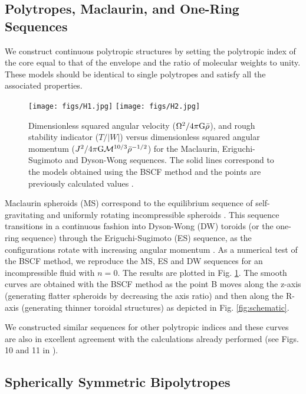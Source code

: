 \documentclass[a4paper,fleqn,usenatbib]{mnras}
\begin{document}
\subsection{Polytropes, Maclaurin, and One-Ring Sequences}

We construct continuous polytropic structures by setting the polytropic index of the core equal to that of the envelope and the ratio of molecular weights to unity. These models should be identical to single polytropes and satisfy all the associated properties. 

\begin{figure}
\centering
\texttt{[image: figs/H1.jpg]}
\texttt{[image: figs/H2.jpg]}
\caption{Dimensionless squared angular velocity ($\Omega^2/ {\rm 4 \pi G} \bar{\rho}$), and rough stability indicator ($T/ | W|$) versus dimensionless squared angular momentum ($J^2/ {\rm 4 \pi G} \mathcal{M}^{10/3} \bar{\rho}^{-1/2} $) for the Maclaurin, Eriguchi-Sugimoto and Dyson-Wong sequences. The solid lines correspond to the models obtained using the BSCF method and the points are previously calculated values \citep{Hachisu1986a}.}
\label{fig:maclaurin}
\end{figure}

Maclaurin spheroids (MS) correspond to the equilibrium sequence of self-gravitating and uniformly rotating incompressible spheroids \citep{Tassoul1978}. 
This sequence transitions in a continuous fashion into Dyson-Wong (DW) toroids (or the one-ring sequence) through the Eriguchi-Sugimoto (ES) sequence, as the configurations rotate with increasing angular momentum \citep{Eriguchi1981}.
As a numerical test of the BSCF method, we reproduce the MS, ES and DW sequences for an incompressible fluid with $n=0$. The results are plotted in Fig. \ref{fig:maclaurin}. The smooth curves are obtained with the BSCF method as the point B moves along the z-axis (generating flatter spheroids by decreasing the axis ratio) and then along the R-axis (generating thinner toroidal structures) as depicted in Fig. \ref{fig:schematic}. 

We constructed similar sequences for other polytropic indices and these curves are also in excellent agreement with the calculations already performed (see Figs. 10 and 11 in \cite{Hachisu1986a}). 


\subsection{Spherically Symmetric Bipolytropes}
\label{SSB}
\end{document}
